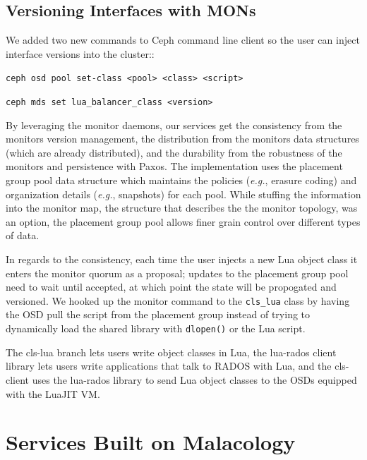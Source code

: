 \documentclass[10pt,twocolumn]{article}
\begin{document}
\subsection{Versioning Interfaces with
MONs}\label{versioning-interfaces-with-mons}

We added two new commands to Ceph command line client so the user can
inject interface versions into the cluster::

\noindent \texttt{ceph\ osd\ pool\ set-class\ \textless{}pool\textgreater{}\ \textless{}class\textgreater{}\ \textless{}script\textgreater{}}

\noindent \texttt{ceph\ mds\ set\ lua\_balancer\_class\ \textless{}version\textgreater{}}

By leveraging the monitor daemons, our services get the consistency from
the monitors version management, the distribution from the monitors data
structures (which are already distributed), and the durability from the
robustness of the monitors and persistence with Paxos. The
implementation uses the placement group pool data structure which
maintains the policies (\emph{e.g.}, erasure coding) and organization
details (\emph{e.g.}, snapshots) for each pool. While stuffing the
information into the monitor map, the structure that describes the the
monitor topology, was an option, the placement group pool allows finer
grain control over different types of data.

In regards to the consistency, each time the user injects a new Lua
object class it enters the monitor quorum as a proposal; updates to the
placement group pool need to wait until accepted, at which point the
state will be propogated and versioned. We hooked up the monitor command
to the \texttt{cls\_lua} class by having the OSD pull the script from
the placement group instead of trying to dynamically load the shared
library with \texttt{dlopen()} or the Lua script.

The cls-lua branch lets users write object classes in Lua, the lua-rados
client library lets users write applications that talk to RADOS with
Lua, and the cls-client uses the lua-rados library to send Lua object
classes to the OSDs equipped with the LuaJIT VM.
\fi

\section{Services Built on Malacology}\label{services-built-on-malacology}

\label{services}
\end{document}
